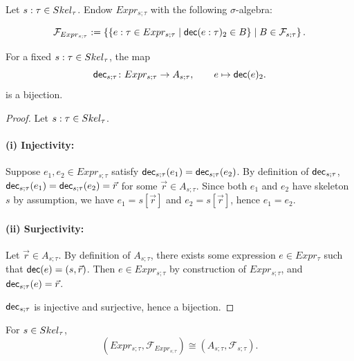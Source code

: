 \begin{definition}\label{def:sigma-algebra-construction-skeletons}
	Let $s : \tau \in Skel_{\tau}$. Endow $Expr_{s;\tau}$ with the following $\sigma$-algebra:

	\[
		\mathcal{F}_{Expr_{s;\tau}}
		:=
		\left\{
			\{e : \tau \in Expr_{s;\tau} \mid \mathsf{dec}(e : \tau)_2 \in B\} \mid B \in 
			\mathcal{F}_{s;\tau}
		\right\}.
	\]
\end{definition}


\begin{lemma}\label{lem:decompose-restriction-bijection}
	For a fixed $s : \tau \in Skel_{\tau}$, the map 
	\[
		\mathsf{dec}_{s;\tau} \colon Expr_{s;\tau} \to A_{s;\tau},
		\qquad
		e \mapsto \mathsf{dec}(e)_2.
	\]
	is a bijection.
\end{lemma}

\begin{proof}
	Let $s : \tau \in Skel_{\tau}$. 

	\paragraph{(i) Injectivity:}

	Suppose $e_1, e_2 \in Expr_{s;\tau}$ satisfy $\mathsf{dec}_{s;\tau}(e_1) = \mathsf{dec}_{s;\tau}(e_2)$. By definition of $\mathsf{dec}_{s;\tau}$, $\mathsf{dec}_{s;\tau}(e_1) = \mathsf{dec}_{s;\tau}(e_2) = \vec{r}$ for some $\vec{r} \in A_{s;\tau}$. Since both $e_1$ and $e_2$ have skeleton $s$ by assumption, we have $e_1 = s[\vec{r}]$ and $e_2 = s[\vec{r}]$, hence $e_1 = e_2$.

	\paragraph{(ii) Surjectivity:}

	Let $\vec{r} \in A_{s;\tau}$. By definition of $A_{s;\tau}$, there exists some expression $e \in Expr_{\tau}$ such that $\mathsf{dec}(e) = (s,\vec{r})$. Then $e \in Expr_{s;\tau}$ by construction of $Expr_{s;\tau}$, and $\mathsf{dec}_{s;\tau}(e) = \vec{r}$.

	\medskip

	$\mathsf{dec}_{s;\tau}$ is injective and surjective, hence a bijection.
\end{proof}

\begin{lemma}\label{lem:isomorphism}
	For $s \in Skel_{\tau}$,
	\[
		(Expr_{s;\tau}, \mathcal{F}_{Expr_{s;\tau}})
		\cong
		(A_{s;\tau}, \mathcal{F}_{s;\tau}).
	\]
\end{lemma}

